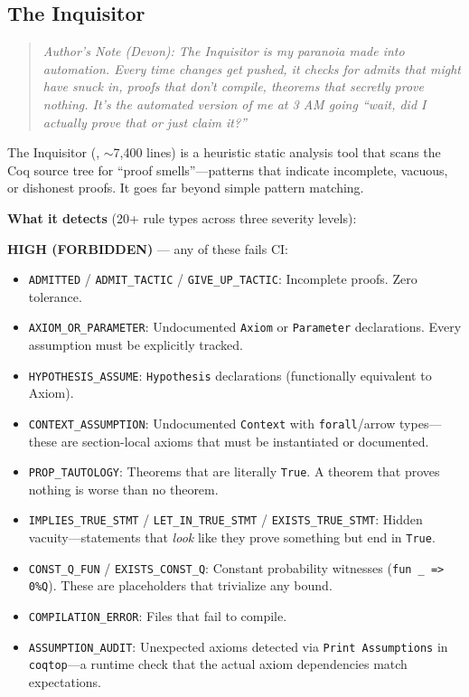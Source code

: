 \subsection{The Inquisitor}

\begin{quote}
\textit{Author's Note (Devon): The Inquisitor is my paranoia made into automation. Every time changes get pushed, it checks for admits that might have snuck in, proofs that don't compile, theorems that secretly prove nothing. It's the automated version of me at 3 AM going ``wait, did I actually prove that or just claim it?''}
\end{quote}

The Inquisitor (, $\sim$7,400 lines) is a heuristic static analysis tool that scans the Coq source tree for ``proof smells''---patterns that indicate incomplete, vacuous, or dishonest proofs. It goes far beyond simple pattern matching.

\textbf{What it detects} (20+ rule types across three severity levels):

\textbf{HIGH (FORBIDDEN)} --- any of these fails CI:
\begin{itemize}
    \item \texttt{ADMITTED} / \texttt{ADMIT\_TACTIC} / \texttt{GIVE\_UP\_TACTIC}: Incomplete proofs. Zero tolerance.
    \item \texttt{AXIOM\_OR\_PARAMETER}: Undocumented \texttt{Axiom} or \texttt{Parameter} declarations. Every assumption must be explicitly tracked.
    \item \texttt{HYPOTHESIS\_ASSUME}: \texttt{Hypothesis} declarations (functionally equivalent to Axiom).
    \item \texttt{CONTEXT\_ASSUMPTION}: Undocumented \texttt{Context} with \texttt{forall}/arrow types---these are section-local axioms that must be instantiated or documented.
    \item \texttt{PROP\_TAUTOLOGY}: Theorems that are literally \texttt{True}. A theorem that proves nothing is worse than no theorem.
    \item \texttt{IMPLIES\_TRUE\_STMT} / \texttt{LET\_IN\_TRUE\_STMT} / \texttt{EXISTS\_TRUE\_STMT}: Hidden vacuity---statements that \textit{look} like they prove something but end in \texttt{True}.
    \item \texttt{CONST\_Q\_FUN} / \texttt{EXISTS\_CONST\_Q}: Constant probability witnesses (\texttt{fun \_ => 0\%Q}). These are placeholders that trivialize any bound.
    \item \texttt{COMPILATION\_ERROR}: Files that fail to compile.
    \item \texttt{ASSUMPTION\_AUDIT}: Unexpected axioms detected via \texttt{Print Assumptions} in \texttt{coqtop}---a runtime check that the actual axiom dependencies match expectations.
\end{itemize}


